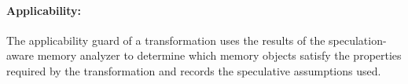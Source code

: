 %



%
%
%


%
\paragraph{Applicability:}
%
The applicability guard of a transformation uses the results of the
speculation-aware memory analyzer to determine which memory objects
satisfy the properties required by the transformation and records the
speculative assumptions used.
%

